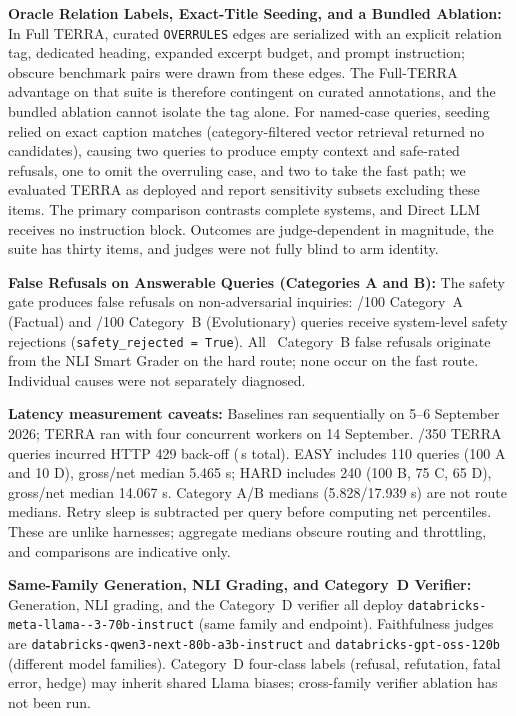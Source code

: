 \item \textbf{Oracle Relation Labels, Exact-Title Seeding, and a Bundled Ablation:} In Full TERRA, curated \texttt{OVERRULES} edges are serialized with an explicit relation tag, dedicated heading, expanded excerpt budget, and prompt instruction; obscure benchmark pairs were drawn from these edges. The Full-TERRA advantage on that suite is therefore contingent on curated annotations, and the bundled ablation cannot isolate the tag alone. For named-case queries, seeding relied on exact caption matches (category-filtered vector retrieval returned no candidates), causing two queries to produce empty context and safe-rated refusals, one to omit the overruling case, and two to take the fast path; we evaluated TERRA as deployed and report sensitivity subsets excluding these items. The primary comparison contrasts complete systems, and Direct LLM receives no instruction block. Outcomes are judge-dependent in magnitude, the suite has thirty items, and judges were not fully blind to arm identity.

\item \label{item:falserefusal}\textbf{False Refusals on Answerable Queries (Categories A and B):}
The safety gate produces false refusals on non-adversarial inquiries: \TerraCatAFalseRefusals/100 Category~A (Factual) and \TerraCatBFalseRefusals/100 Category~B (Evolutionary) queries receive system-level safety rejections (\texttt{safety\_rejected = True}). All \TerraCatBFalseRefusals\ Category~B false refusals originate from the NLI Smart Grader on the hard route; none occur on the fast route. Individual causes were not separately diagnosed.

\item \textbf{Latency measurement caveats:} Baselines ran sequentially on 5--6 September 2026; TERRA ran with four concurrent workers on 14 September. \TerraThrottledRows/350 TERRA queries incurred HTTP 429 back-off (\TerraThrottleSleepSeconds\,s total). EASY includes 110 queries (100 A and 10 D), gross/net median 5.465 s; HARD includes 240 (100 B, 75 C, 65 D), gross/net median 14.067 s. Category A/B medians (5.828/17.939 s) are not route medians. Retry sleep is subtracted per query before computing net percentiles. These are unlike harnesses; aggregate medians obscure routing and throttling, and comparisons are indicative only.

\item \label{item:samefamily}\textbf{Same-Family Generation, NLI Grading, and Category~D Verifier:}
Generation, NLI grading, and the Category~D verifier all deploy \texttt{databricks-\allowbreak meta-\allowbreak llama--3-70b-\allowbreak instruct} (same family and endpoint). Faithfulness judges are \texttt{databricks-\allowbreak qwen3-next-\allowbreak 80b-a3b-\allowbreak instruct} and \texttt{databricks-\allowbreak gpt-oss-120b} (different model families). Category~D four-class labels (refusal, refutation, fatal error, hedge) may inherit shared Llama biases; cross-family verifier ablation has not been run.

